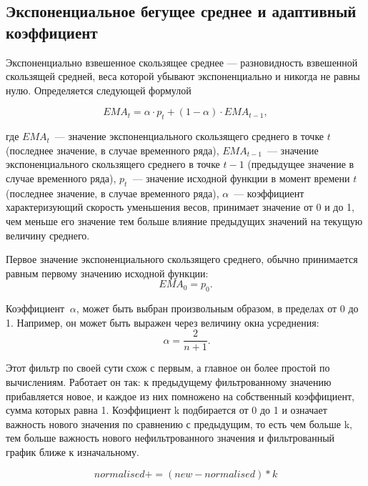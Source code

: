 \subsection{Экспоненциальное бегущее среднее и адаптивный коэффициент}

Экспоненциально взвешенное скользящее среднее --- разновидность взвешенной скользящей средней, веса которой убывают экспоненциально и никогда не равны нулю. \cite{glide1} Определяется следующей формулой

\begin{equation}
	\textit{EMA}_t  = \alpha \cdot p_t + (1-\alpha) \cdot \textit{EMA}_{t-1},
\end{equation}

где $\textit{EMA}_t$ --- значение экспоненциального скользящего среднего в точке $t$ (последнее значение, в случае временного ряда), $\textit{EMA}_{t-1}$ --- значение экспоненциального скользящего среднего в точке $t-1$ (предыдущее значение в случае временного ряда), $p_t$ --- значение исходной функции в момент времени $t$ (последнее значение, в случае временного ряда),
$\alpha$ ---  коэффициент характеризующий скорость уменьшения весов, принимает значение от 0 и до 1, чем меньше его значение тем больше влияние предыдущих значений на текущую величину среднего. \cite{diskretiz}

Первое значение экспоненциального скользящего среднего, обычно принимается равным первому значению исходной функции:
\begin{equation}
	\textit{EMA}_0  = p_0.
\end{equation}

Коэффициент $\ \alpha$, может быть выбран произвольным образом, в пределах от 0 до 1. \cite{med3} Например, он может быть выражен через величину окна усреднения:
\begin{equation}
	\ \alpha = \frac{2}{n + 1}.
\end{equation}

Этот фильтр по своей сути схож с первым, а главное он более простой по вычислениям. \cite{glide2} Работает он так: к предыдущему фильтрованному значению прибавляется новое, и каждое из них помножено на собственный коэффициент, сумма которых равна 1. Коэффициент k подбирается от 0 до 1 и означает важность нового значения по сравнению с предыдущим, то есть чем больше k, тем больше важность нового нефильтрованного значения и фильтрованный график ближе к изначальному. \cite{med4}

\begin{equation}
	normalised += (new - normalised) * k
\end{equation}

